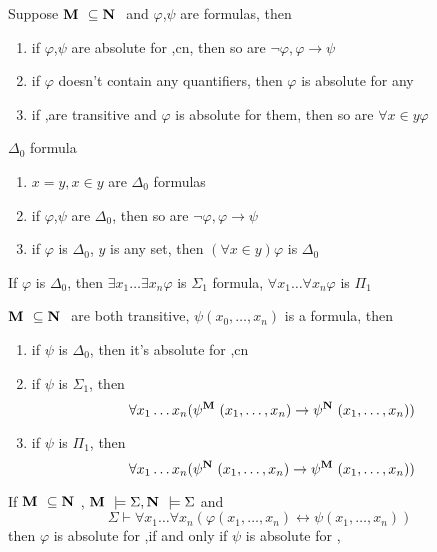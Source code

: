 \documentclass[11pt]{article}
\begin{document}
\begin{lemma}[]
Suppose \(\textbf{M }\subseteq\textbf{N }\) and \(\varphi\),\(\psi\) are formulas, then
\begin{enumerate}
\item if \(\varphi\),\(\psi\) are absolute for \cm,cn, then so are
\(\neg\varphi,\varphi\to\psi\)
\item if \(\varphi\) doesn't contain any quantifiers, then \(\varphi\) is absolute for
any \cm
\item if \cm,\cn  are transitive and \(\varphi\) is absolute for them, then so are
\(\forall x\in y\varphi\)
\end{enumerate}
\end{lemma}

\begin{definition}[]
\(\Delta_0\) formula
\begin{enumerate}
\item \(x=y,x\in y\) are \(\Delta_0\) formulas
\item if \(\varphi\),\(\psi\) are \(\Delta_0\), then so are \(\neg\varphi,\varphi\to\psi\)
\item if \(\varphi\) is \(\Delta_0\), \(y\) is any set, then \((\forall x\in y)\varphi\)
is \(\Delta_0\)
\end{enumerate}


If \(\varphi\) is \(\Delta_0\), then \(\exists x_1\dots\exists x_n\varphi\) is
\(\Sigma_1\) formula, \(\forall x_1\dots\forall x_n\varphi\) is \(\Pi_1\)
\end{definition}

\begin{lemma}[]
\(\textbf{M }\subseteq\textbf{N }\) are both transitive, \(\psi(x_0,\dots,x_n)\) is a formula,
then
\begin{enumerate}
\item if \(\psi\) is \(\Delta_0\), then it's absolute for \cm,cn
\item if \(\psi\) is \(\Sigma_1\), then
\begin{equation*}
\forall x_1\dots x_n(\psi^{\textbf{M }}(x_1,\dots,x_n)\to\psi^{\textbf{N }}(x_1,\dots,x_n))
\end{equation*}
\item if \(\psi\) is \(\Pi_1\), then
\begin{equation*}
\forall x_1\dots x_n(\psi^{\textbf{N }}(x_1,\dots,x_n)\to\psi^{\textbf{M }}(x_1,\dots,x_n))
\end{equation*}
\end{enumerate}
\end{lemma}

\begin{lemma}[]
If \(\textbf{M }\subseteq\textbf{N }\), \(\textbf{M }\models\Sigma,\textbf{N }\models\Sigma\) and
\begin{equation*}
\Sigma\vdash\forall x_1\dots\forall x_n(\varphi(x_1,\dots,x_n)\leftrightarrow
\psi(x_1,\dots,x_n))
\end{equation*}
then \(\varphi\) is absolute for \cm,\cn if and only if \(\psi\) is absolute for \cm,\cn
\end{lemma}
\end{document}
